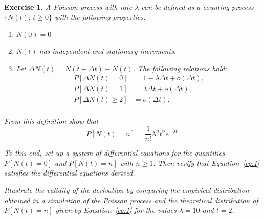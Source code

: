 
\textbf{Exercise 1. }\emph{A Poisson process with rate \( \lambda \) can be defined as a counting process \( \{N(t);\, t \geq 0\} \) with the following properties:}
\begin{enumerate}
  \item \emph{\( N(0) = 0 \) }
  \item \( N(t) \) \emph{has independent and stationary increments}.
  \item \emph{Let \( \Delta N(t)  = N(t + \Delta t) - N(t)\). The following relations hold: }
        \[
        \begin{aligned}
          P[\Delta N(t) = 0] &= 1 - \lambda \Delta t + o(\Delta t),\\
          P[\Delta N(t) = 1] &= \lambda \Delta t + o(\Delta t),\\
          P[\Delta N(t) \geq 2] &= o(\Delta t).\\
        \end{aligned}
        \]
\end{enumerate}
\emph{From this definition show that}
\begin{equation}\label{eq:1}
  P[N(t) = n] = \frac{1}{n!}\lambda^{n}t^{n} e^{-\lambda t}.
\end{equation}

\emph{To this end, set up a system of differential equations for the quantities \( P[N(t) = 0] \) and \( P[N(t) = n] \) with \( n \geq 1 \). Then verify that Equation~\ref{eq:1} satisfies the differential equations derived.}

\emph{Illustrate the validity of the derivation by comparing the empirical distribution obtained in a simulation of the Poisson process and the theoretical distribution of \( P[N(t) = n ]\) given by Equation~\ref{eq:1} for the values \( \lambda = 10 \) and \( t = 2 \).}

